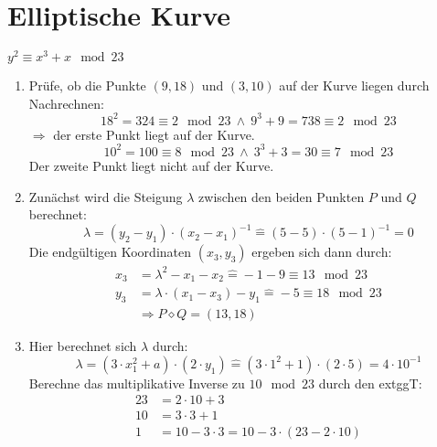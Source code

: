 \documentclass[DIN, pagenumber=false, fontsize=11pt, parskip=half]{scrartcl}
\newcommand{\congTo}[3][]{\stackrel{#1}{\equiv} #2\mod #3}
\begin{document}
    \section{Elliptische Kurve}
    $y^2 \congTo{x^3+x}{23}$
    \begin{enumerate}[label=\alph*)]
        \item Prüfe, ob die Punkte $(9, 18)$ und $(3, 10)$ auf der Kurve liegen durch Nachrechnen:
              \begin{equation*}
                  18^2 = 324 \congTo{2}{23} \ \wedge \ 9^3 + 9 = 738 \congTo{2}{23}
              \end{equation*}
              $\Rightarrow$ der erste Punkt liegt auf der Kurve.
              \begin{equation*}
                  10^2 = 100 \congTo{8}{23} \ \wedge \ 3^3 + 3 = 30 \congTo{7}{23}
              \end{equation*}
              Der zweite Punkt liegt nicht auf der Kurve.
        \item Zunächst wird die Steigung $\lambda$ zwischen den beiden Punkten $P$ und $Q$ berechnet:
              \begin{equation*}
                  \lambda = (y_2 - y_1) \cdot (x_2 - x_1)^{-1} \hat{=} (5 - 5) \cdot (5 - 1)^{-1} = 0
              \end{equation*}
              Die endgültigen Koordinaten $(x_3, y_3)$ ergeben sich dann durch:
              \begin{align*}
                  x_3 &= \lambda^2 - x_1 - x_2 \hat{=} -1 - 9 \congTo{13}{23} \\
                  y_3 &= \lambda \cdot (x_1 - x_3) - y_1 \hat{=} -5 \congTo{18}{23} \\
                  &\Rightarrow P \diamond Q = (13, 18)
              \end{align*}
        \item Hier berechnet sich $\lambda$ durch:
              \begin{equation*}
                  \lambda = (3 \cdot x_1^2 + a) \cdot (2 \cdot y_1) \hat{=} (3 \cdot 1^2 + 1) \cdot (2 \cdot 5) = 4 \cdot 10^{-1}
              \end{equation*}
              Berechne das multiplikative Inverse zu $10 \mod 23$ durch den extggT:
              \begin{align*}
                  23 &= 2 \cdot 10 + 3 \\
                  10 &= 3 \cdot 3 + 1  \\
                  1 &= 10 - 3 \cdot 3 = 10 - 3 \cdot (23 - 2 \cdot 10) \\

\end{align*}
\end{enumerate}
\end{document}
